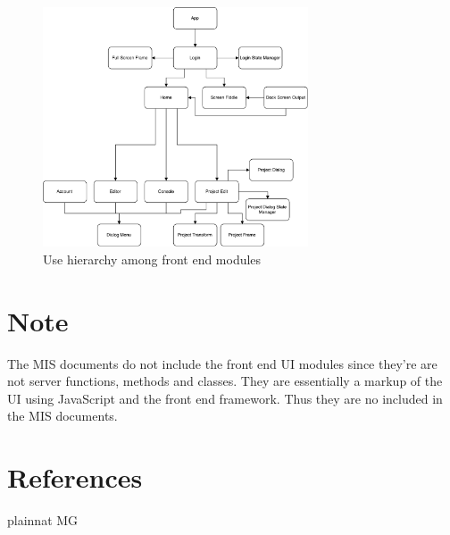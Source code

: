 \documentclass[12pt, titlepage]{article}
\begin{document}
\begin{figure}[H]
\centering
\includegraphics[width=0.7\textwidth]{uses-frontend.pdf}
\caption{Use hierarchy among front end modules}
\label{FigUH}
\end{figure}

\section*{Note}
The MIS documents do not include the front end UI modules since they're are not
server functions, methods and classes. They are essentially a markup of the UI
using JavaScript and the front end framework. Thus they are no included in the
MIS documents.

\section*{References}

 {plainnat}
 {MG}
\end{document}
